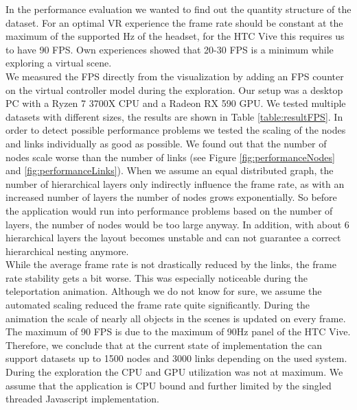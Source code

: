 In the performance evaluation we wanted to find out the quantity structure of the dataset. 
For an optimal VR experience the frame rate should be constant at the maximum of the supported Hz of the headset, for the HTC Vive this requires us to have 90 FPS.
Own experiences showed that 20-30 FPS is a minimum while exploring a virtual scene.
\\
We measured the FPS directly from the visualization by adding an FPS counter on the virtual controller model during the exploration. Our setup was a desktop PC with a Ryzen 7 3700X CPU and a Radeon RX 590 GPU. 
We tested multiple datasets with different sizes, the results are shown in Table \ref{table:resultFPS}. 
In order to detect possible performance problems we tested the scaling of the nodes and links individually as good as possible.
We found out that the number of nodes scale worse than the number of links (see Figure \ref{fig:performanceNodes} and \ref{fig:performanceLinks}). 
When we assume an equal distributed graph, the number of hierarchical layers only indirectly influence the frame rate, as with an increased number of layers the number of nodes grows exponentially. 
So before the application would run into performance problems based on the number of layers, the number of nodes would be too large anyway. 
In addition, with about 6 hierarchical layers the layout becomes unstable and can not guarantee a correct hierarchical nesting anymore.
\\
While the average frame rate is not drastically reduced by the links, the frame rate stability gets a bit worse. 
This was especially noticeable during the teleportation animation. 
Although we do not know for sure, we assume the automated scaling reduced the frame rate quite significantly. During the animation the scale of nearly all objects in the scenes is updated on every frame.
The maximum of 90 FPS is due to the maximum of 90Hz panel of the HTC Vive.
\\
Therefore, we conclude that at the current state of implementation the can support datasets up to 1500 nodes and 3000 links depending on the used system. 
During the exploration the CPU and GPU utilization was not at maximum. We assume that the application is CPU bound and further limited by the singled threaded Javascript implementation.

